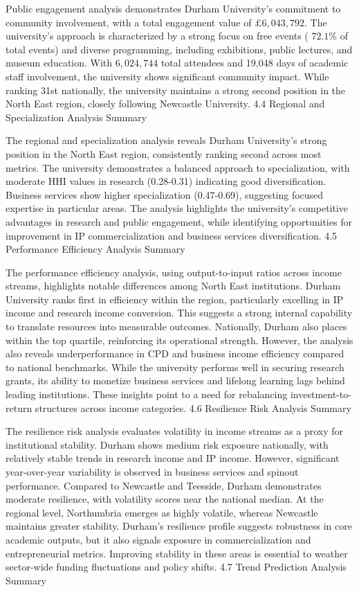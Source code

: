 Public engagement analysis demonstrates Durham University's commitment to community involvement, with a total engagement value of $£ 6,043,792$. The university's approach is characterized by a strong focus on free events ( $72.1 \%$ of total events) and diverse programming, including exhibitions, public lectures, and museum education. With $6,024,744$ total attendees and 19,048 days of academic staff involvement, the university shows significant community impact. While ranking 31st nationally, the university maintains a strong second position in the North East region, closely following Newcastle University.
4.4 Regional and Specialization Analysis Summary

The regional and specialization analysis reveals Durham University's strong position in the North East region, consistently ranking second across most metrics. The university demonstrates a balanced approach to specialization, with moderate HHI values in research (0.28-0.31) indicating good diversification. Business services show higher specialization (0.47-0.69), suggesting focused expertise in particular areas. The analysis highlights the university's competitive advantages in research and public engagement, while identifying opportunities for improvement in IP commercialization and business services diversification.
4.5 Performance Efficiency Analysis Summary

The performance efficiency analysis, using output-to-input ratios across income streams, highlights notable differences among North East institutions. Durham University ranks first in efficiency within the region, particularly excelling in IP income and research income conversion. This suggests a strong internal capability to translate resources into measurable outcomes. Nationally, Durham also places within the top quartile, reinforcing its operational strength.
However, the analysis also reveals underperformance in CPD and business income efficiency compared to national benchmarks. While the university performs well in securing research grants, its ability to monetize business services and lifelong learning lags behind leading institutions. These insights point to a need for rebalancing investment-to-return structures across income categories.
4.6 Resilience Risk Analysis Summary

The resilience risk analysis evaluates volatility in income streams as a proxy for institutional stability. Durham shows medium risk exposure nationally, with relatively stable trends in research income and IP income. However, significant year-over-year variability is observed in business services and spinout performance. Compared to Newcastle and Teesside, Durham demonstrates moderate resilience, with volatility scores near the national median.
At the regional level, Northumbria emerges as highly volatile, whereas Newcastle maintains greater stability. Durham's resilience profile suggests robustness in core academic outputs, but it also signals exposure in commercialization and entrepreneurial metrics. Improving stability in these areas is essential to weather sector-wide funding fluctuations and policy shifts.
4.7 Trend Prediction Analysis Summary

